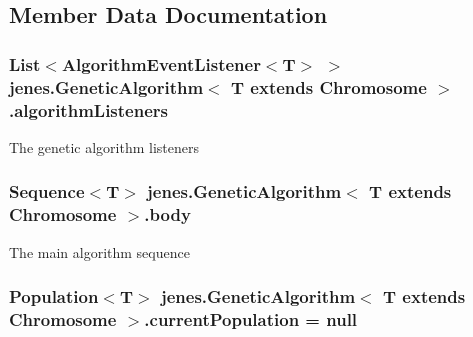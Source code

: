 \subsection{Member Data Documentation}
\hypertarget{classjenes_1_1_genetic_algorithm_3_01_t_01extends_01_chromosome_01_4_a53540867ddd13889614232b3cbea6d6f}{
\subsubsection[{algorithm\-Listeners}]{\setlength{\rightskip}{0pt plus 5cm}List$<$Algorithm\-Event\-Listener$<$T$>$ $>$ jenes.\-Genetic\-Algorithm$<$ T extends Chromosome $>$.algorithm\-Listeners\hspace{0.3cm}{\ttfamily [protected]}}}\label{classjenes_1_1_genetic_algorithm_3_01_t_01extends_01_chromosome_01_4_a53540867ddd13889614232b3cbea6d6f}
The genetic algorithm listeners \hypertarget{classjenes_1_1_genetic_algorithm_3_01_t_01extends_01_chromosome_01_4_a0040f9dbb0018e8bb28dde97dacac7d8}{
\subsubsection[{body}]{\setlength{\rightskip}{0pt plus 5cm}Sequence$<$T$>$ jenes.\-Genetic\-Algorithm$<$ T extends Chromosome $>$.body\hspace{0.3cm}{\ttfamily [protected]}}}\label{classjenes_1_1_genetic_algorithm_3_01_t_01extends_01_chromosome_01_4_a0040f9dbb0018e8bb28dde97dacac7d8}
The main algorithm sequence \hypertarget{classjenes_1_1_genetic_algorithm_3_01_t_01extends_01_chromosome_01_4_a13cd44ba0fe337e32a545fa925f570c7}{
\subsubsection[{current\-Population}]{\setlength{\rightskip}{0pt plus 5cm}Population$<$T$>$ jenes.\-Genetic\-Algorithm$<$ T extends Chromosome $>$.current\-Population = null\hspace{0.3cm}{\ttfamily [private]}}}\label{classjenes_1_1_genetic_algorithm_3_01_t_01extends_01_chromosome_01_4_a13cd44ba0fe337e32a545fa925f570c7}
